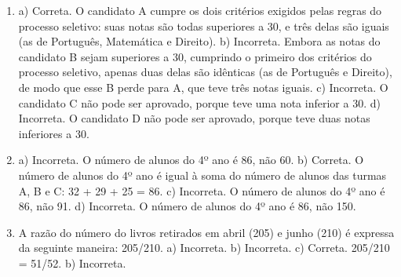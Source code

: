 \begin{enumerate}
\item
a) Correta. O candidato A cumpre os dois critérios exigidos pelas
regras do processo seletivo: suas notas são todas superiores a 30, e três
delas são iguais (as de Português, Matemática e Direito).
b) Incorreta. Embora as notas do candidato B sejam superiores a 30, 
cumprindo o primeiro dos critérios do processo seletivo, apenas duas 
delas são idênticas (as de Português e Direito), de modo que esse 
B perde para A, que teve três notas iguais. 
c) Incorreta. O candidato C não pode ser aprovado, porque teve uma nota
inferior a 30.
d) Incorreta. O candidato D não pode ser aprovado, porque teve duas notas
inferiores a 30.

\item
a) Incorreta. O número de alunos do 4º ano é 86, não 60.
b) Correta. O número de alunos do 4º ano é igual à soma do número de
alunos das turmas A, B e C: 32 + 29 + 25 = 86.
c) Incorreta. O número de alunos do 4º ano é 86, não 91.
d) Incorreta. O número de alunos do 4º ano é 86, não 150.

\item
A razão do número do livros retirados em abril (205) e junho 
(210) é expressa da seguinte maneira: 205/210.  
a) Incorreta. 
b) Incorreta.
c) Correta. 205/210 = 51/52.
b) Incorreta.
\end{enumerate}



